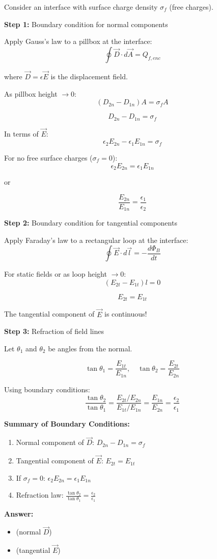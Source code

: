 \documentclass[12pt,a4paper]{article}
\begin{document}
\begin{solution}
Consider an interface with surface charge density $\sigma_f$ (free charges).

\textbf{Step 1:} Boundary condition for normal components

Apply Gauss's law to a pillbox at the interface:
$$\oint \vec{D} \cdot d\vec{A} = Q_{f,enc}$$

where $\vec{D} = \epsilon\vec{E}$ is the displacement field.

As pillbox height $\to 0$:
$$(D_{2n} - D_{1n})A = \sigma_f A$$

$$D_{2n} - D_{1n} = \sigma_f$$

In terms of $\vec{E}$:
$$\epsilon_2 E_{2n} - \epsilon_1 E_{1n} = \sigma_f$$

For no free surface charges ($\sigma_f = 0$):
$$\epsilon_2 E_{2n} = \epsilon_1 E_{1n}$$

or

$$\frac{E_{2n}}{E_{1n}} = \frac{\epsilon_1}{\epsilon_2}$$

\textbf{Step 2:} Boundary condition for tangential components

Apply Faraday's law to a rectangular loop at the interface:
$$\oint \vec{E} \cdot d\vec{l} = -\frac{d\Phi_B}{dt}$$

For static fields or as loop height $\to 0$:
$$(E_{2t} - E_{1t})l = 0$$

$$E_{2t} = E_{1t}$$

The tangential component of $\vec{E}$ is continuous!

\textbf{Step 3:} Refraction of field lines

Let $\theta_1$ and $\theta_2$ be angles from the normal.

$$\tan\theta_1 = \frac{E_{1t}}{E_{1n}}, \quad \tan\theta_2 = \frac{E_{2t}}{E_{2n}}$$

Using boundary conditions:
$$\frac{\tan\theta_2}{\tan\theta_1} = \frac{E_{2t}/E_{2n}}{E_{1t}/E_{1n}} = \frac{E_{1n}}{E_{2n}} = \frac{\epsilon_2}{\epsilon_1}$$

\textbf{Summary of Boundary Conditions:}

\begin{enumerate}
    \item Normal component of $\vec{D}$: $D_{2n} - D_{1n} = \sigma_f$
    \item Tangential component of $\vec{E}$: $E_{2t} = E_{1t}$
    \item If $\sigma_f = 0$: $\epsilon_2 E_{2n} = \epsilon_1 E_{1n}$
    \item Refraction law: $\frac{\tan\theta_2}{\tan\theta_1} = \frac{\epsilon_2}{\epsilon_1}$
\end{enumerate}

\textbf{Answer:}
\begin{itemize}
    \item {} (normal $\vec{D}$)
    \item {} (tangential $\vec{E}$)
\end{itemize}
\end{solution}
\end{document}
